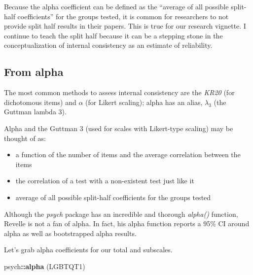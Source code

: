 \documentclass[
  english,
]{book}
\newenvironment{Shaded}{\begin{snugshade}}{\end{snugshade}}
\newcommand{\KeywordTok}[1]{\textcolor[rgb]{0.13,0.29,0.53}{\textbf{#1}}}
\newcommand{\NormalTok}[1]{#1}
\newcommand{\OperatorTok}[1]{\textcolor[rgb]{0.81,0.36,0.00}{\textbf{#1}}}
\providecommand{\tightlist}{%
  \setlength{\itemsep}{0pt}\setlength{\parskip}{0pt}}
\begin{document}
Because the alpha coefficient can be defined as the ``average of all possible split-half coefficients'' for the groups tested, it is common for researchers to not provide split half results in their papers. This is true for our research vignette. I continue to teach the split half because it can be a stepping stone in the conceptualization of internal consistency as an estimate of reliability.

\hypertarget{from-alpha}{%
\subsection{From alpha}\label{from-alpha}}

The most common methods to assess internal consistency are the \emph{KR20} (for dichotomous items) and \(\alpha\) (for Likert scaling); alpha has an alias, \(\lambda _{3}\) (the Guttman lambda 3).

Alpha and the Guttman 3 (used for scales with Likert-type scaling) may be thought of as:

\begin{itemize}
\tightlist
\item
  a function of the number of items and the average correlation between the items
\item
  the correlation of a test with a non-existent test just like it
\item
  average of all possible split-half coefficients for the groups tested
\end{itemize}

Although the \emph{psych} package has an incredible and thorough \emph{alpha()} function, Revelle is not a fan of alpha. In fact, his alpha function reports a 95\% CI around alpha as well as bootstrapped alpha results.

Let's grab alpha coefficients for our total and subscales.

\begin{Shaded}
\begin{Highlighting}[]
\NormalTok{psych}\OperatorTok{::}\KeywordTok{alpha}\NormalTok{ (LGBTQT1)}
\end{Highlighting}
\end{Shaded}
\end{document}
